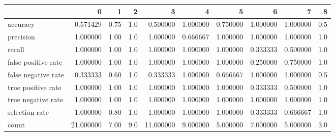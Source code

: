 \begin{tabular}{lrrrrrrrrr}
\toprule
{} &          0 &     1 &    2 &          3 &         4 &         5 &         6 &         7 &    8 \\
\midrule
accuracy            &   0.571429 &  0.75 &  1.0 &   0.500000 &  1.000000 &  0.750000 &  1.000000 &  1.000000 &  0.5 \\
precision           &   1.000000 &  1.00 &  1.0 &   1.000000 &  0.666667 &  1.000000 &  1.000000 &  1.000000 &  1.0 \\
recall              &   1.000000 &  1.00 &  1.0 &   1.000000 &  1.000000 &  1.000000 &  0.333333 &  0.500000 &  1.0 \\
false positive rate &   1.000000 &  1.00 &  1.0 &   1.000000 &  1.000000 &  1.000000 &  0.250000 &  0.750000 &  1.0 \\
false negative rate &   0.333333 &  0.60 &  1.0 &   0.333333 &  1.000000 &  0.666667 &  1.000000 &  1.000000 &  0.5 \\
true positive rate  &   1.000000 &  1.00 &  1.0 &   1.000000 &  1.000000 &  1.000000 &  0.333333 &  0.500000 &  1.0 \\
true negative rate  &   1.000000 &  1.00 &  1.0 &   1.000000 &  1.000000 &  1.000000 &  1.000000 &  1.000000 &  1.0 \\
selection rate      &   1.000000 &  0.80 &  1.0 &   1.000000 &  1.000000 &  1.000000 &  0.333333 &  0.666667 &  1.0 \\
count               &  21.000000 &  7.00 &  9.0 &  11.000000 &  9.000000 &  5.000000 &  7.000000 &  5.000000 &  3.0 \\
\bottomrule
\end{tabular}
